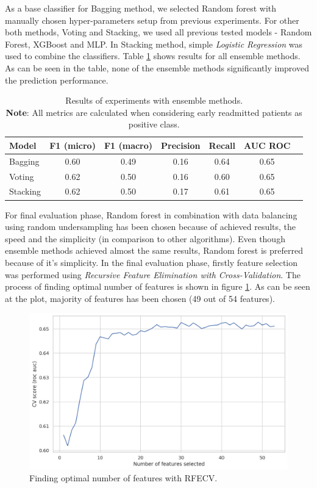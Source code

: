 \documentclass[runningheads]{llncs}
\begin{document}
As a base classifier for Bagging method, we selected Random forest with manually chosen hyper-parameters setup from previous experiments. For other both methods, Voting and Stacking, we used all previous tested models - Random Forest, XGBoost and MLP. In Stacking method, simple \textit{Logistic Regression} was used to combine the classifiers. Table \ref{table:ensemble-results} shows results for all ensemble methods. As can be seen in the table, none of the ensemble methods significantly improved the prediction performance. 
\begin{table}
    \centering
    \caption{Results of experiments with ensemble methods.\\\textbf{Note}: All metrics are calculated when considering early readmitted patients as positive class.}
    \begin{tabular}{ |l|c|c|c|c|c|c| } 
    \hline
    \textbf{Model} & \textbf{F1 (micro)} & \textbf{F1 (macro)} & \textbf{Precision} &  \textbf{Recall} &  \textbf{AUC ROC} \\
    \hline
    Bagging &   0.60    &   0.49    &   0.16    &   0.64   &   0.65\\
    Voting &   0.62    &   0.50    &   0.16    &   0.60   &   0.65\\
    Stacking &   0.62    &   0.50    &   0.17    &   0.61   &   0.65\\
    \hline
    \end{tabular}
    \label{table:ensemble-results}
\end{table}

For final evaluation phase, Random forest in combination with data balancing using random undersampling has been chosen because of achieved results, the speed and the simplicity (in comparison to other algorithms). Even though ensemble methods achieved almost the same results, Random forest is preferred because of it's simplicity. In the final evaluation phase, firstly feature selection was performed using \textit{Recursive Feature Elimination with Cross-Validation}. The process of finding optimal number of features is shown in figure \ref{fig:feature-selection}. As can be seen at the plot, majority of features has been chosen (49 out of 54 features).

\begin{figure}[h]
    \centering
    \includegraphics[width=0.9\linewidth]{figures/feature_selection.png}
    \caption{Finding optimal number of features with RFECV.}
    \label{fig:feature-selection}
\end{figure}
\end{document}
